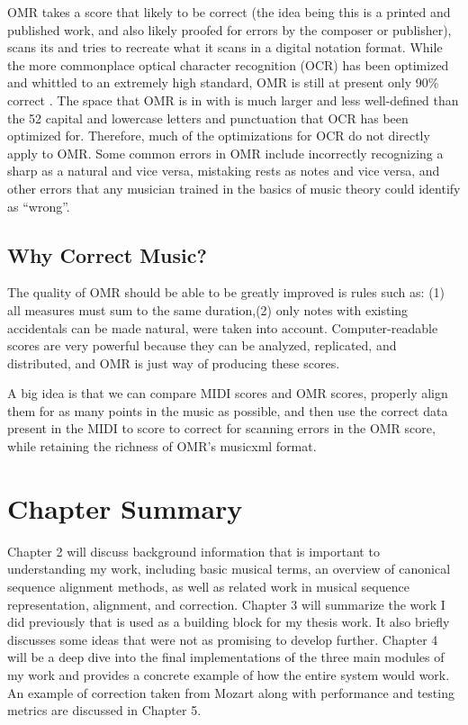 OMR takes a score that likely to be correct (the idea being this is a printed and published work, and also likely proofed for errors by the composer or publisher), scans its and tries to recreate what it scans in a digital notation format. While the more commonplace optical character recognition (OCR) has been optimized and whittled to an extremely high standard, OMR is still at present only 90\% correct \cite{rebelo}. The space that OMR is in with is much larger and less well-defined than the 52 capital and lowercase letters and punctuation that OCR has been optimized for. Therefore, much of the optimizations for OCR do not directly apply to OMR. Some common errors in OMR include incorrectly recognizing a sharp as a natural and vice versa, mistaking rests as notes and vice versa, and other errors that any musician trained in the basics of music theory could identify as ``wrong''. 

\subsection{Why Correct Music?}
The quality of OMR should be able to be greatly improved is rules such as: (1) all measures must sum to the same duration,(2) only notes with existing accidentals can be made natural, were taken into account. Computer-readable scores are very powerful because they can be analyzed, replicated, and distributed, and OMR is just way of producing these scores. 

A big idea is that we can compare MIDI scores and OMR scores, properly align them for as many points in the music as possible, and then use the correct data present in the MIDI to score to correct for scanning errors in the OMR score, while retaining the richness of OMR's musicxml format.

\section{Chapter Summary}
Chapter 2 will discuss background information that is important to understanding my work, including basic musical terms, an overview of canonical sequence alignment methods, as well as related work in musical sequence representation, alignment, and correction. Chapter 3 will summarize the work I did previously that is used as a building block for my thesis work. It also briefly discusses some ideas that were not as promising to develop further. Chapter 4 will be a deep dive into the final implementations of the three main modules of my work and provides a concrete example of how the entire system would work. An example of correction taken from Mozart along with performance and testing metrics are discussed in Chapter 5.
